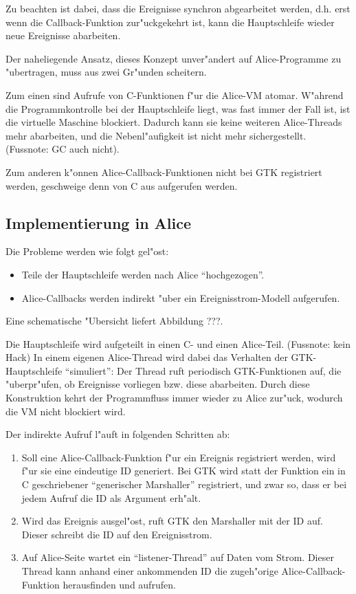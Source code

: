 \documentclass{article}
\begin{document}
Zu beachten ist dabei, dass die Ereignisse synchron abgearbeitet werden,
d.h. erst wenn die Callback-Funktion zur"uckgekehrt ist, kann die Hauptschleife
wieder neue Ereignisse abarbeiten.

Der naheliegende Ansatz, dieses Konzept unver"andert auf Alice-Programme
zu "ubertragen, muss aus zwei Gr"unden scheitern.
 
Zum einen sind Aufrufe von C-Funktionen f"ur die Alice-VM atomar. W"ahrend die
Programmkontrolle bei der Hauptschleife liegt, was fast immer der Fall ist,
ist die virtuelle Maschine blockiert. Dadurch kann sie keine weiteren
Alice-Threads mehr abarbeiten, und die Nebenl"aufigkeit ist nicht mehr
sichergestellt. (Fussnote: GC auch nicht).

Zum anderen k"onnen Alice-Callback-Funktionen nicht bei GTK registriert werden,
geschweige denn von C aus aufgerufen werden.

\subsection{Implementierung in Alice}

Die Probleme werden wie folgt gel"ost:

\begin{itemize}
\item Teile der Hauptschleife werden nach Alice ``hochgezogen''.
\item Alice-Callbacks werden indirekt "uber ein Ereignisstrom-Modell
      aufgerufen.
\end{itemize}

Eine schematische "Ubersicht liefert Abbildung ???.

Die Hauptschleife wird aufgeteilt in einen C- und einen Alice-Teil.
(Fussnote: kein Hack) In einem eigenen Alice-Thread wird dabei das Verhalten
der GTK-Hauptschleife ``simuliert'': Der Thread ruft periodisch
GTK-Funktionen auf, die "uberpr"ufen, ob Ereignisse vorliegen bzw. diese
abarbeiten. Durch diese Konstruktion kehrt der Programmfluss immer wieder
zu Alice zur"uck, wodurch die VM nicht blockiert wird.

Der indirekte Aufruf l"auft in folgenden Schritten ab:

\begin{enumerate}
\item Soll eine Alice-Callback-Funktion f"ur ein Ereignis registriert werden,
      wird f"ur sie eine eindeutige ID generiert. 
      Bei GTK wird statt der Funktion ein in C geschriebener
      ``generischer Marshaller'' registriert, und zwar so, dass er bei jedem
      Aufruf die ID als Argument erh"alt.
\item Wird das Ereignis ausgel"ost, ruft GTK den Marshaller mit der ID auf.
      Dieser schreibt die ID auf den Ereignisstrom.
\item Auf Alice-Seite wartet ein ``listener-Thread'' auf Daten vom Strom.
      Dieser Thread kann anhand einer ankommenden ID die zugeh"orige
      Alice-Callback-Funktion herausfinden und aufrufen.
\end{enumerate}
\end{document}
